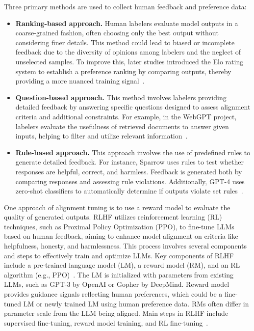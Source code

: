 Three primary methods are used to collect human feedback and preference data:
\begin{itemize}
	\item \textbf{Ranking-based approach.} {
		      Human labelers evaluate model outputs in a coarse-grained fashion, often choosing only the best output without considering finer details. This method could lead to biased or incomplete feedback due to the diversity of opinions among labelers and the neglect of unselected samples. To improve this, later studies introduced the Elo rating system to establish a preference ranking by comparing outputs, thereby providing a more nuanced training signal~\cite{glaese2022improving, ziegler2019fine}.
	      }
	\item \textbf{Question-based approach.} {
		      This method involves labelers providing detailed feedback by answering specific questions designed to assess alignment criteria and additional constraints. For example, in the WebGPT project, labelers evaluate the usefulness of retrieved documents to answer given inputs, helping to filter and utilize relevant information~\cite{nakano2021webgpt}.
	      }
	\item \textbf{Rule-based approach.} {
		      This approach involves the use of predefined rules to generate detailed feedback. For instance, Sparrow uses rules to test whether responses are helpful, correct, and harmless. Feedback is generated both by comparing responses and assessing rule violations. Additionally, GPT-4 uses zero-shot classifiers to automatically determine if outputs violate set rules~\cite{glaese2022improving, radford2023gpt4}.
	      }
\end{itemize}

One approach of alignment tuning is to use a reward model to evaluate the quality of generated outputs.
RLHF utilizes reinforcement learning (RL) techniques, such as Proximal Policy Optimization (PPO), to fine-tune LLMs based on human feedback, aiming to enhance model alignment on criteria like helpfulness, honesty, and harmlessness.
This process involves several components and steps to effectively train and optimize LLMs.
Key components of RLHF include a pre-trained language model (LM), a reward model (RM), and an RL algorithm (e.g., PPO)~\cite{survey}.
The LM is initialized with parameters from existing LLMs, such as GPT-3 by OpenAI or Gopher by DeepMind.
Reward model provides guidance signals reflecting human preferences, which could be a fine-tuned LM or newly trained LM using human preference data.
RMs often differ in parameter scale from the LLM being aligned.
Main steps in RLHF include supervised fine-tuning, reward model training, and RL fine-tuning~\cite{survey}.

